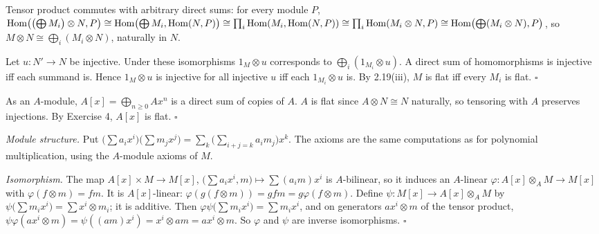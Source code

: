 \documentclass[11pt]{article}
\begin{document}
\pf
Tensor product commutes with arbitrary direct sums: for every module $P$,
$\operatorname{Hom}\bigl(\bigl(\bigoplus M_i\bigr)\otimes N,P\bigr)\cong\operatorname{Hom}\bigl(\bigoplus M_i,\operatorname{Hom}(N,P)\bigr)\cong\prod_i\operatorname{Hom}(M_i,\operatorname{Hom}(N,P))\cong\prod_i\operatorname{Hom}(M_i\otimes N,P)\cong\operatorname{Hom}\bigl(\bigoplus(M_i\otimes N),P\bigr)$, so $M\otimes N\cong\bigoplus_i(M_i\otimes N)$, naturally in $N$.

Let $u:N'\to N$ be injective. Under these isomorphisms $1_M\otimes u$ corresponds to $\bigoplus_i(1_{M_i}\otimes u)$. A direct sum of homomorphisms is injective iff each summand is. Hence $1_M\otimes u$ is injective for all injective $u$ iff each $1_{M_i}\otimes u$ is. By 2.19(iii), $M$ is flat iff every $M_i$ is flat. \hfill$\square$

\pf
As an $A$-module, $A[x]=\bigoplus_{n\ge0}Ax^n$ is a direct sum of copies of $A$. $A$ is flat since $A\otimes N\cong N$ naturally, so tensoring with $A$ preserves injections. By Exercise 4, $A[x]$ is flat. \hfill$\square$

\pf
\emph{Module structure.} Put $\bigl(\sum a_ix^i\bigr)\bigl(\sum m_jx^j\bigr)=\sum_k\bigl(\sum_{i+j=k}a_im_j\bigr)x^k$. The axioms are the same computations as for polynomial multiplication, using the $A$-module axioms of $M$.

\emph{Isomorphism.} The map $A[x]\times M\to M[x]$, $\bigl(\sum a_ix^i,m\bigr)\mapsto\sum(a_im)x^i$ is $A$-bilinear, so it induces an $A$-linear $\varphi:A[x]\otimes_AM\to M[x]$ with $\varphi(f\otimes m)=fm$. It is $A[x]$-linear: $\varphi(g(f\otimes m))=gfm=g\varphi(f\otimes m)$. Define $\psi:M[x]\to A[x]\otimes_AM$ by $\psi\bigl(\sum m_ix^i\bigr)=\sum x^i\otimes m_i$; it is additive. Then $\varphi\psi\bigl(\sum m_ix^i\bigr)=\sum m_ix^i$, and on generators $ax^i\otimes m$ of the tensor product, $\psi\varphi(ax^i\otimes m)=\psi((am)x^i)=x^i\otimes am=ax^i\otimes m$. So $\varphi$ and $\psi$ are inverse isomorphisms. \hfill$\square$
\end{document}
